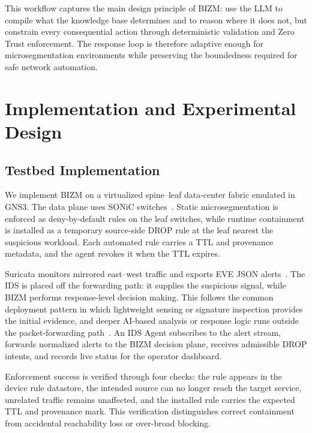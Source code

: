 \documentclass[final,5p]{elsarticle}
\begin{document}
This workflow captures the main design principle of BIZM: use the LLM to compile what the knowledge base determines and to reason where it does not, but constrain every consequential action through deterministic validation and Zero Trust enforcement. The response loop is therefore adaptive enough for microsegmentation environments while preserving the boundedness required for safe network automation.

\section{Implementation and Experimental Design}
\label{sec:implementation_experiment}

\subsection{Testbed Implementation}
\label{sec:testbed_implementation}

We implement BIZM on a virtualized spine--leaf data-center fabric emulated in GNS3. The data plane uses SONiC switches~\cite{sonic2026}. Static microsegmentation is enforced as deny-by-default rules on the leaf switches, while runtime containment is installed as a temporary source-side DROP rule at the leaf nearest the suspicious workload. Each automated rule carries a TTL and provenance metadata, and the agent revokes it when the TTL expires.

Suricata monitors mirrored east--west traffic and exports EVE JSON alerts~\cite{oisf2026suricata}. The IDS is placed off the forwarding path: it supplies the suspicious signal, while BIZM performs response-level decision making. This follows the common deployment pattern in which lightweight sensing or signature inspection provides the initial evidence, and deeper AI-based analysis or response logic runs outside the packet-forwarding path~\cite{cSDAID22,jSAID23,jAPELID24}. An IDS Agent subscribes to the alert stream, forwards normalized alerts to the BIZM decision plane, receives admissible DROP intents, and records live status for the operator dashboard.

Enforcement success is verified through four checks: the rule appears in the device rule datastore, the intended source can no longer reach the target service, unrelated traffic remains unaffected, and the installed rule carries the expected TTL and provenance mark. This verification distinguishes correct containment from accidental reachability loss or over-broad blocking.
\end{document}
